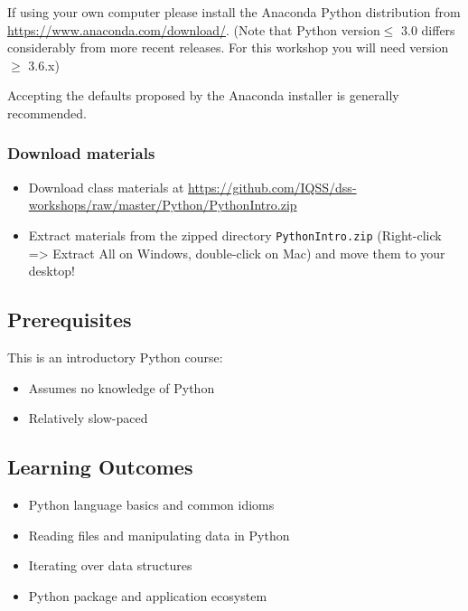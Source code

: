 \documentclass[]{book}
\providecommand{\tightlist}{%
  \setlength{\itemsep}{0pt}\setlength{\parskip}{0pt}}
\begin{document}
If using your own computer please install the Anaconda Python distribution from \url{https://www.anaconda.com/download/}. (Note that Python version\(\leq\) 3.0 differs considerably from more recent releases. For this workshop you will need version\(\geq\) 3.6.x)

Accepting the defaults proposed by the Anaconda installer is generally recommended.

\hypertarget{download-materials}{%
\subsubsection{Download materials}\label{download-materials}}

\begin{itemize}
\tightlist
\item
  Download class materials at \url{https://github.com/IQSS/dss-workshops/raw/master/Python/PythonIntro.zip}
\item
  Extract materials from the zipped directory \texttt{PythonIntro.zip} (Right-click =\textgreater{} Extract All on Windows, double-click on Mac) and move them to your desktop!
\end{itemize}

\hypertarget{prerequisites-4}{%
\subsection{Prerequisites}\label{prerequisites-4}}

This is an introductory Python course:

\begin{itemize}
\tightlist
\item
  Assumes no knowledge of Python
\item
  Relatively slow-paced
\end{itemize}

\hypertarget{learning-outcomes-4}{%
\subsection{Learning Outcomes}\label{learning-outcomes-4}}

\begin{itemize}
\tightlist
\item
  Python language basics and common idioms
\item
  Reading files and manipulating data in Python
\item
  Iterating over data structures
\item
  Python package and application ecosystem
\end{itemize}
\end{document}
